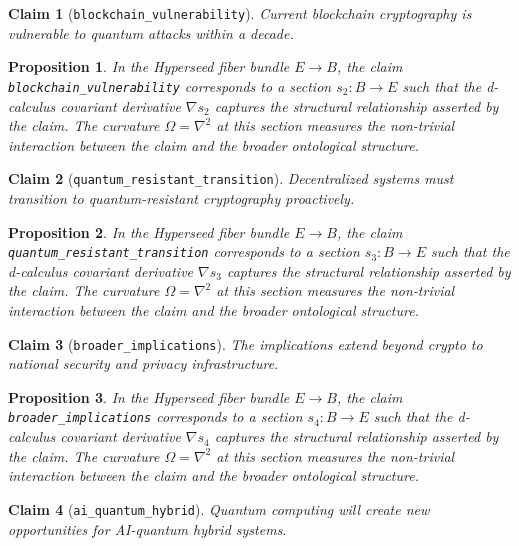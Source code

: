 \documentclass{article}
\newtheorem{claim}{Claim}
\newtheorem{proposition}{Proposition}
\begin{document}
\begin{claim}[\texttt{blockchain_vulnerability}]
Current blockchain cryptography is vulnerable to quantum attacks within a decade.
\end{claim}

\begin{proposition}
In the Hyperseed fiber bundle $E \to B$, the claim \texttt{blockchain_vulnerability} corresponds to a section $s_2: B \to E$ such that the d-calculus covariant derivative $\nabla s_2$ captures the structural relationship asserted by the claim. The curvature $\Omega = \nabla^2$ at this section measures the non-trivial interaction between the claim and the broader ontological structure.
\end{proposition}

\begin{claim}[\texttt{quantum_resistant_transition}]
Decentralized systems must transition to quantum-resistant cryptography proactively.
\end{claim}

\begin{proposition}
In the Hyperseed fiber bundle $E \to B$, the claim \texttt{quantum_resistant_transition} corresponds to a section $s_3: B \to E$ such that the d-calculus covariant derivative $\nabla s_3$ captures the structural relationship asserted by the claim. The curvature $\Omega = \nabla^2$ at this section measures the non-trivial interaction between the claim and the broader ontological structure.
\end{proposition}

\begin{claim}[\texttt{broader_implications}]
The implications extend beyond crypto to national security and privacy infrastructure.
\end{claim}

\begin{proposition}
In the Hyperseed fiber bundle $E \to B$, the claim \texttt{broader_implications} corresponds to a section $s_4: B \to E$ such that the d-calculus covariant derivative $\nabla s_4$ captures the structural relationship asserted by the claim. The curvature $\Omega = \nabla^2$ at this section measures the non-trivial interaction between the claim and the broader ontological structure.
\end{proposition}

\begin{claim}[\texttt{ai_quantum_hybrid}]
Quantum computing will create new opportunities for AI-quantum hybrid systems.
\end{claim}
\end{document}
